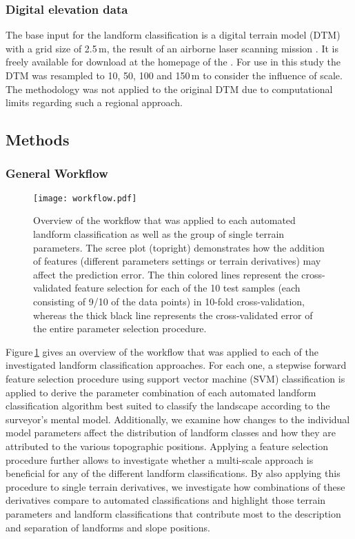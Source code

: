 \documentclass[preprint,12pt,authoryear]{elsarticle}
\begin{document}
\subsubsection{Digital elevation data}
The base input for the landform classification is a digital terrain model (DTM) with a grid size of 2.5\,m, the result of an airborne laser scanning mission \citep{Wack2005}. It is freely available for download at the homepage of the \cite{DTM}. For use in this study the DTM was resampled to 10, 50, 100 and 150\,m to consider the influence of scale. The methodology was not applied to the original DTM due to computational limits regarding such a regional approach.
\subsection{Methods}
\subsubsection{General Workflow}
\begin{figure}
\texttt{[image: workflow.pdf]}
\caption{Overview of the workflow that was applied to each automated landform classification as well as the group of single terrain parameters. The scree plot (topright) demonstrates how the addition of features (different parameters settings or terrain derivatives) may affect the prediction error. The thin colored lines represent the cross-validated feature selection for each of the 10 test samples (each consisting of 9/10 of the data points) in 10-fold cross-validation, whereas the thick black line represents the cross-validated error of the entire parameter selection procedure.}
\label{fig:workflow}
\end{figure}
Figure\,\ref{fig:workflow} gives an overview of the workflow that was applied to each of the investigated landform classification approaches. For each one, a stepwise forward feature selection procedure using support vector machine (SVM) classification is applied to derive the parameter combination of each automated landform classification algorithm best suited to classify the landscape according to the surveyor's mental model. Additionally, we examine how changes to the individual model parameters affect the distribution of landform classes and how they are attributed to the various topographic positions. Applying a feature selection procedure further allows to investigate whether a multi-scale approach is beneficial for any of the different landform classifications. By also applying this procedure to single terrain derivatives, we investigate how combinations of these derivatives compare to automated classifications and highlight those terrain parameters and landform classifications that contribute most to the description and separation of landforms and slope positions.
\end{document}
